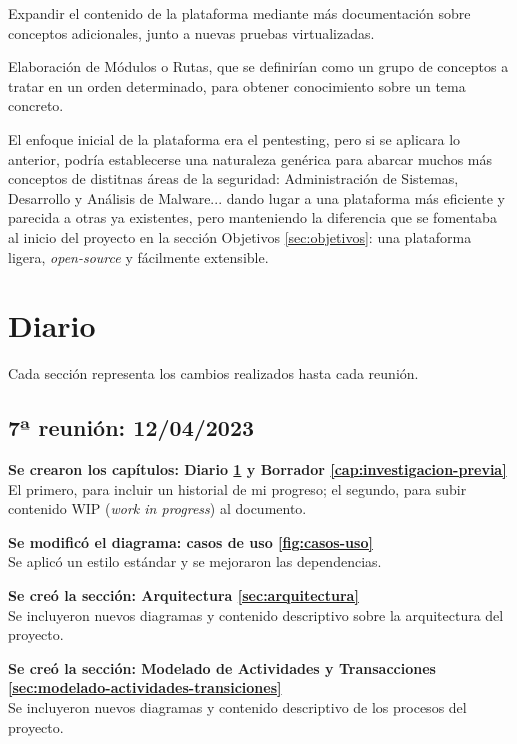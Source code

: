         Expandir el contenido de la plataforma mediante más documentación sobre conceptos adicionales, junto a nuevas pruebas virtualizadas.
        
        Elaboración de Módulos o Rutas, que se definirían como un grupo de conceptos a tratar en un orden determinado, para obtener conocimiento sobre un tema concreto.
        
        El enfoque inicial de la plataforma era el pentesting, pero si se aplicara lo anterior, podría establecerse una naturaleza genérica para abarcar muchos más conceptos de distitnas áreas de la seguridad: Administración de Sistemas, Desarrollo y Análisis de Malware... dando lugar a una plataforma más eficiente y parecida a otras ya existentes, pero manteniendo la diferencia que se fomentaba al inicio del proyecto en la sección Objetivos \ref{sec:objetivos}: una plataforma ligera, \textit{open-source} y fácilmente extensible.

        \cleardoublepage
        


\chapter{Diario}
    \label{cap:diario}

    Cada sección representa los cambios realizados hasta cada reunión.

    \section{7ª reunión: 12/04/2023}
    
        \textbf{Se crearon los capítulos: Diario \ref{cap:diario} y Borrador \ref{cap:investigacion-previa}} \\
        El primero, para incluir un historial de mi progreso; el segundo, para subir contenido WIP (\textit{work in progress}) al documento.
        
        \textbf{Se modificó el diagrama: casos de uso \ref{fig:casos-uso}} \\
        Se aplicó un estilo estándar y se mejoraron las dependencias.
        
        \textbf{Se creó la sección: Arquitectura \ref{sec:arquitectura}} \\
        Se incluyeron nuevos diagramas y contenido descriptivo sobre la arquitectura del proyecto.
        
        \textbf{Se creó la sección: Modelado de Actividades y Transacciones \ref{sec:modelado-actividades-transiciones}} \\
        Se incluyeron nuevos diagramas y contenido descriptivo de los procesos del proyecto.
        
